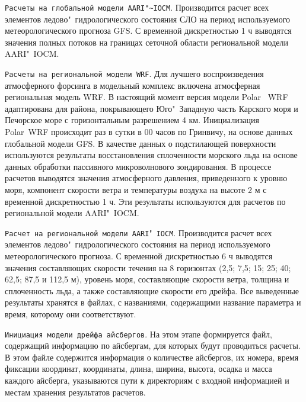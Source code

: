 \verb|Расчеты на глобальной модели AARI"~IOCM|. Производится расчет всех элементов ледово"~гидрологического состояния СЛО на период используемого метеорологического прогноза GFS. С временной дискретностью 1 ч выводятся значения полных потоков на границах сеточной области региональной модели AARI"~IOCM.  

\verb|Расчеты на региональной модели WRF|. Для лучшего воспроизведения атмосферного форсинга в модельный комплекс включена атмосферная региональная модель WRF. В настоящий момент версия модели Polar~ WRF~\cite{bromwich2009development} адаптирована для района, покрывающего Юго"~Западную часть Карского моря и Печорское море с горизонтальным разрешением 4 км. Инициализация Polar~WRF происходит раз в сутки в 00 часов по Гринвичу, на основе данных глобальной модели GFS. В качестве данных о подстилающей поверхности используются результаты восстановления сплоченности морского льда на основе данных обработки пассивного микроволнового зондирования. В процессе расчетов выводятся значения атмосферного давления, приведенного к уровню моря, компонент скорости ветра и температуры воздуха на высоте 2 м с временной дискретностью 1 ч. Эти результаты используются для расчетов по региональной модели AARI"~IOCM.

\verb|Расчет на региональной модели AARI|"~\verb|IOCM|. Производится расчет всех элементов ледово"~гидрологического состояния на период используемого метеорологического прогноза. С временной дискретностью 6 ч выводятся значения составляющих скорости течения на 8 горизонтах (2,5; 7,5; 15; 25; 40; 62,5; 87,5 и 112,5 м), уровень моря, составляющие скорости ветра, толщина и сплоченность льда, а также составляющие скорости его дрейфа. Все выведенные результаты хранятся в файлах, с названиями, содержащими название параметра и время, которому они соответствуют.

\verb|Инициация модели дрейфа айсбергов|. На этом этапе формируется файл, содержащий информацию по айсбергам, для которых будут проводиться расчеты. В этом файле содержится информация о количестве айсбергов, их номера, время фиксации координат, координаты, длина, ширина, высота, осадка и масса каждого айсберга, указываются пути к директориям с входной информацией и местам хранения результатов расчетов.

